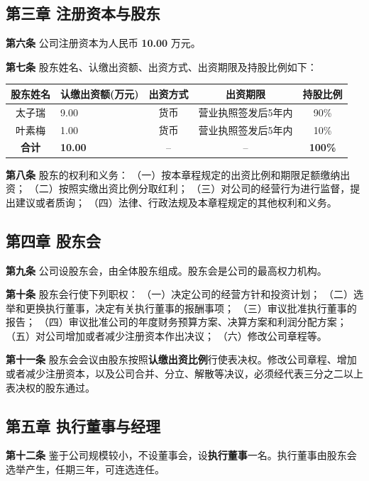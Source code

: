 \documentclass[a4paper, 12pt]{ctexart}
\begin{document}
\subsection*{第三章 注册资本与股东}
\textbf{第六条} 公司注册资本为人民币 \textbf{10.00} 万元。

\textbf{第七条} 股东姓名、认缴出资额、出资方式、出资期限及持股比例如下：
\begin{table}[h]
\centering
\begin{tabularx}{\textwidth}{|c|X|c|c|c|}
\hline
\textbf{股东姓名} & \textbf{认缴出资额(万元)} & \textbf{出资方式} & \textbf{出资期限} & \textbf{持股比例} \\
\hline
太子瑞 & 9.00 & 货币 & 营业执照签发后5年内 & 90\% \\
\hline
叶素梅 & 1.00 & 货币 & 营业执照签发后5年内 & 10\% \\
\hline
\textbf{合计} & \textbf{10.00} & -- & -- & \textbf{100\%} \\
\hline
\end{tabularx}
\end{table}

\textbf{第八条} 股东的权利和义务：
（一）按本章程规定的出资比例和期限足额缴纳出资；
（二）按照实缴出资比例分取红利；
（三）对公司的经营行为进行监督，提出建议或者质询；
（四）法律、行政法规及本章程规定的其他权利和义务。

\subsection*{第四章 股东会}
\textbf{第九条} 公司设股东会，由全体股东组成。股东会是公司的最高权力机构。

\textbf{第十条} 股东会行使下列职权：
（一）决定公司的经营方针和投资计划；
（二）选举和更换执行董事，决定有关执行董事的报酬事项；
（三）审议批准执行董事的报告；
（四）审议批准公司的年度财务预算方案、决算方案和利润分配方案；
（五）对公司增加或者减少注册资本作出决议；
（六）修改公司章程等。

\textbf{第十一条} 股东会会议由股东按照\textbf{认缴出资比例}行使表决权。修改公司章程、增加或者减少注册资本，以及公司合并、分立、解散等决议，必须经代表三分之二以上表决权的股东通过。

\subsection*{第五章 执行董事与经理}
\textbf{第十二条} 鉴于公司规模较小，不设董事会，设\textbf{执行董事}一名。执行董事由股东会选举产生，任期三年，可连选连任。
\end{document}
